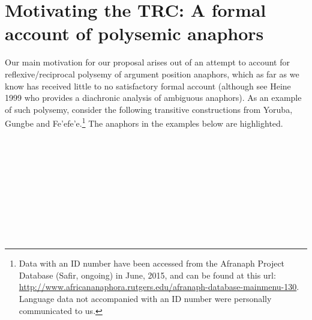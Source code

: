 \documentclass[output=paper]{langsci/langscibook}
\begin{document}
\chapter{Motivating the TRC: A formal account of polysemic anaphors}
\setcounter{listWWviiiNumxixleveli}{0}
\begin{listWWviiiNumxixleveli}
\begin{styleExample}
  Our main motivation for our proposal arises out of an attempt to account for reflexive/reciprocal polysemy of argument position anaphors, which as far as we know has received little to no satisfactory formal account (although see Heine 1999 who provides a diachronic analysis of ambiguous anaphors). As an example of such polysemy, consider the following transitive constructions from Yoruba, Gungbe and Fe'efe'e.\footnote{ Data with an ID number have been accessed from the Afranaph Project Database (Safir, ongoing) in June, 2015, and can be found at this url: \url{http://www.africananaphora.rutgers.edu/afranaph-database-mainmenu-130}. Language data not accompanied with an ID number were personally communicated to us.} The anaphors in the examples below are highlighted.
\end{styleExample}
\end{listWWviiiNumxixleveli}
\setcounter{listWWviiiNumxlileveli}{0}
\begin{listWWviiiNumxlileveli}
\item \ea\label{ex:}
\\
\ea\label{ex:}
\\
\ea\label{ex:}
\\
\ea\label{ex:}
\\
\end{listWWviiiNumxlileveli}
\begin{listWWviiiNumxlileveli}
\item \ea\label{ex:}
\\
\ea\label{ex:}
\\
\ea\label{ex:}
\\
\ea\label{ex:}
\\
\end{listWWviiiNumxlileveli}
\end{document}
